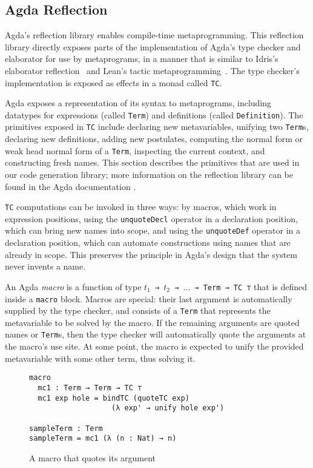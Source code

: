 \documentclass[sigplan,10pt]{acmart}
\begin{document}
\subsection{Agda Reflection}
\label{sec:sec2.1}
Agda's reflection library enables compile-time metaprogramming.
This reflection library directly exposes parts of the implementation of Agda's type checker and elaborator for use by metaprograms, in a manner that is similar to Idris's elaborator reflection~\citep{davidphd,David-2016} and Lean's tactic metaprogramming~\citep{Ebner2017}.
The type checker's implementation is exposed as effects in a monad called \texttt{TC}.

Agda exposes a representation of its syntax to metaprograms, including datatypes for expressions (called \texttt{Term}) and definitions (called \texttt{Definition}).
The primitives exposed in \texttt{TC} include declaring new metavariables, unifying two \texttt{Term}s, declaring new definitions, adding new postulates, computing the normal form or weak head normal form of a \texttt{Term}, inspecting the current context, and constructing fresh names.
This section describes the primitives that are used in our code generation library; more information on the reflection library can be found in the Agda documentation \cite{Agda-doc-2017}.

\texttt{TC} computations can be invoked in three ways: by macros, which work in expression positions, using the \texttt{unquoteDecl} operator in a declaration position, which can bring new names into scope, and using the \texttt{unquoteDef} operator in a declaration position, which can automate constructions using names that are already in scope.
This preserves the principle in Agda's design that the system never invents a name.

An Agda \emph{macro} is a function of type {\tt $t_1$ → $t_2$ → $\ldots$ → Term → TC ⊤} that is defined inside a \texttt{macro} block.
Macros are special: their last argument is automatically supplied by the type checker, and consists of a \texttt{Term} that represents the metavariable to be solved by the macro.
If the remaining arguments are quoted names or \texttt{Term}s, then the type checker will automatically quote the arguments at the macro's use site.
At some point, the macro is expected to unify the provided metavariable with some other term, thus solving it.


\begin{figure}
\begin{Verbatim}
macro
  mc1 : Term → Term → TC ⊤
  mc1 exp hole = bindTC (quoteTC exp) 
                   (λ exp' → unify hole exp')

sampleTerm : Term
sampleTerm = mc1 (λ (n : Nat) → n) 
\end{Verbatim}
  \caption{A macro that quotes its argument}
  \label{fig:macro1}
\end{figure}
\end{document}
